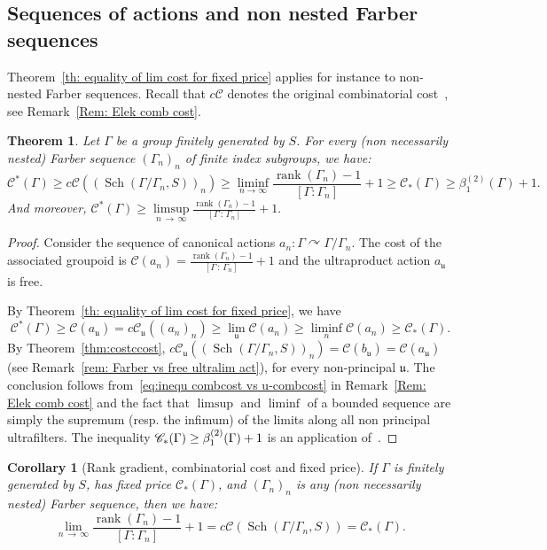 \documentclass[10pt]{amsart}
\newtheorem{theo}[cdrthm]{Theorem}
\newtheorem{coro}[cdrthm]{Corollary}
\theoremstyle{definition}
\newcommand{\acting}{\curvearrowright}
\newcommand{\cost}{\mathcal{C}}
\newcommand{\ccost}{c\mathcal{C}}
\newcommand{\vraicost}{\mathscr{C}}
\DeclareMathOperator{\rank}{rank}
\DeclareMathOperator{\Sch}{Sch}
\newcommand{\ul}{\mathfrak{u}}
\begin{document}
\subsection{Sequences of actions and non nested Farber sequences}


Theorem~\ref{th: equality of lim cost for fixed price} applies for instance to non-nested Farber sequences. Recall that $\ccost$ denotes the original combinatorial cost~\cite{Elek-combinatorial-cost-2007}, see Remark~\ref{Rem: Elek comb cost}.
\begin{theo}\label{cor: rk grad vs cost - non fixed price}
Let $\Gamma$ be a group finitely generated by $S$. For every (non necessarily nested) Farber sequence $(\Gamma_n)_n$ of finite index subgroups, we have:
\[
\vraicost^*(\Gamma)\geq \ccost\left(\left(\Sch\left(\Gamma/\Gamma_n, S\right)\right)_n\right) \geq \liminf\limits_{n\to \infty}\frac{\rank(\Gamma_n)-1}{[\Gamma:\Gamma_n]} +1\geq \vraicost_*(\Gamma)\geq \beta^{(2)}_1(\Gamma)+1.
\]
And moreover, $
\vraicost^*(\Gamma)\geq \limsup\limits_{n\,\to\,\infty} \tfrac{\rank(\Gamma_n)-1}{[\Gamma\,:\,\Gamma_n]}+1. $
\end{theo}

\begin{proof}
Consider the sequence of canonical actions $a_n:\Gamma\acting \Gamma/\Gamma_n$. The cost of the associated groupoid is $\cost(a_n)=\tfrac{\rank(\Gamma_n)-1}{[\Gamma\,:\,\Gamma_n]}+1$ and the ultraproduct action $a_\ul$ is free.


By Theorem~\ref{th: equality of lim cost for fixed price}, we have
\[
\vraicost^*(\Gamma)\geq \cost(a_\ul)=\ccost_\ul((a_n)_n) \geq \lim_{\ul}\cost(a_{n})\geq \liminf_{n}\cost(a_{n}) \geq \vraicost_*(\Gamma).
\]
By Theorem~\ref{thm:costccost}, $\ccost_\ul((\Sch(\Gamma/\Gamma_n, S))_n)=\cost(b_\ul)=\cost(a_\ul)$ (see Remark~\ref{rem: Farber vs free ultralim act}), for every non-principal $\ul$. The conclusion follows from~\eqref{eq:inequ combcost vs u-combcost} in Remark~\ref{Rem: Elek comb cost} and the fact that $\limsup$ and $\liminf$ of a bounded sequence are simply the supremum (resp. the infimum) of the limits along all non principal ultrafilters. The inequality $\vraicost_*(\Gamma)\linebreak\geq \beta^{(2)}_1(\Gamma)+1$ is an application of~\cite[Corollaire~3.23]{gab_ihes}.
\end{proof}

\begin{coro}[Rank gradient, combinatorial cost and fixed price]\label{cor: rk grad vs cost fixed price}
If $\Gamma$ is finitely generated by $S$, has fixed price $\vraicost_*(\Gamma)$, and $(\Gamma_n)_n$ is any (non necessarily nested) Farber sequence, then we have:
\[
\lim\limits_{n\,\to\,\infty} \frac{\rank(\Gamma_n)-1}{[\Gamma:\Gamma_n]}+1=\ccost\left(\Sch\left(\Gamma/\Gamma_n, S\right)\right)=\vraicost_*(\Gamma).
\]
\end{coro}
\end{document}
